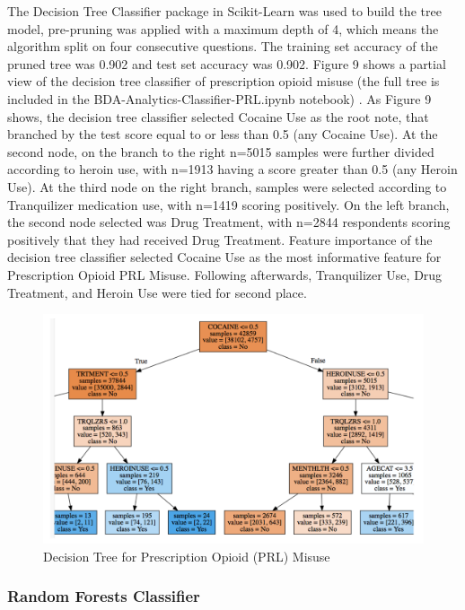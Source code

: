 \documentclass[sigconf]{acmart}
\begin{document}
The Decision Tree Classifier package in Scikit-Learn was used to build the 
tree model, pre-pruning was applied with a maximum depth of 4, which means 
the algorithm split on four consecutive questions. The training set accuracy 
of the pruned tree was 0.902 and test set accuracy was 0.902. Figure 9 shows 
a partial view of the decision tree classifier of prescription opioid misuse
(the full tree is included in the BDA-Analytics-Classifier-PRL.ipynb 
notebook) \cite{classifyPRL}. As Figure 9 shows, the decision tree classifier
selected Cocaine Use as the root note, that branched by the test score equal
to or less than 0.5 (any Cocaine Use). At the second node, on the branch to 
the right n=5015 samples were further divided according to heroin use, with 
n=1913 having a score greater than 0.5 (any Heroin Use). At the third node
on the right branch, samples were selected according to Tranquilizer
medication use, with n=1419 scoring positively. On the left branch, the 
second node selected was Drug Treatment, with n=2844 respondents scoring
positively that they had received Drug Treatment. Feature importance of
the decision tree classifier selected Cocaine Use as the most informative
feature for Prescription Opioid PRL Misuse. Following afterwards, 
Tranquilizer Use, Drug Treatment, and Heroin Use were tied for second place. 

\begin{figure}[!ht]
  \centering\includegraphics[width=\columnwidth]{images/Figure9.pdf}
  \caption{Decision Tree for Prescription Opioid (PRL) Misuse}
  \label{f:Figure9}
\end{figure}

\subsubsection{Random Forests Classifier}
\end{document}
